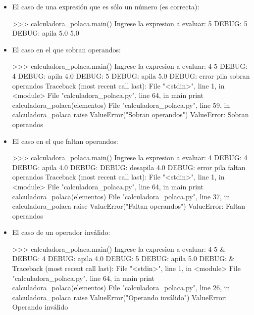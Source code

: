 \begin{itemize}
\item El caso de una expresión que es sólo un número (es correcta):

\begin{codigo-python-sn}
>>> calculadora_polaca.main()
Ingrese la expresion a evaluar: 5
DEBUG: 5
DEBUG: apila  5.0
5.0
\end{codigo-python-sn}

\item El caso en el que sobran operandos:

\begin{codigo-python-sn}
>>> calculadora_polaca.main()
Ingrese la expresion a evaluar: 4 5
DEBUG: 4
DEBUG: apila  4.0
DEBUG: 5
DEBUG: apila  5.0
DEBUG: error pila sobran operandos
Traceback (most recent call last):
  File "<stdin>", line 1, in <module>
  File "calculadora_polaca.py", line 64, in main
    print calculadora_polaca(elementos)
  File "calculadora_polaca.py", line 59, in calculadora_polaca
    raise ValueError("Sobran operandos")
ValueError: Sobran operandos
\end{codigo-python-sn}

\item El caso en el que faltan operandos:

\begin{codigo-python-sn}
>>> calculadora_polaca.main()
Ingrese la expresion a evaluar: 4 %
DEBUG: 4
DEBUG: apila  4.0
DEBUG: %
DEBUG: desapila  4.0
DEBUG: error pila faltan operandos
Traceback (most recent call last):
  File "<stdin>", line 1, in <module>
  File "calculadora_polaca.py", line 64, in main
    print calculadora_polaca(elementos)
  File "calculadora_polaca.py", line 37, in calculadora_polaca
    raise ValueError("Faltan operandos")
ValueError: Faltan operandos
\end{codigo-python-sn}

\item El caso de un operador inválido:

\begin{codigo-python-sn}
>>> calculadora_polaca.main()
Ingrese la expresion a evaluar: 4 5 &
DEBUG: 4
DEBUG: apila  4.0
DEBUG: 5
DEBUG: apila  5.0
DEBUG: &
Traceback (most recent call last):
  File "<stdin>", line 1, in <module>
  File "calculadora_polaca.py", line 64, in main
    print calculadora_polaca(elementos)
  File "calculadora_polaca.py", line 26, in calculadora_polaca
    raise ValueError("Operando inválido")
ValueError: Operando inválido
\end{codigo-python-sn}


\end{itemize}
